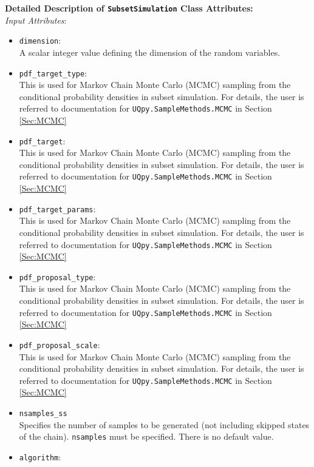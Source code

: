 \documentclass[./UsersGuide.tex]{subfiles}
\begin{document}
\noindent\textbf{Detailed Description of \texttt{SubsetSimulation} Class Attributes:}\\

\noindent\textit{Input Attributes}:
\begin{itemize}
\item \texttt{dimension}:\\ 
	A scalar integer value defining the dimension of the random variables. 
\item \texttt{pdf\_target\_type}:\\ 
	This is used for Markov Chain Monte Carlo (MCMC) sampling from the conditional probability densities in subset simulation. For details, the user is referred to documentation for 		\texttt{UQpy.SampleMethods.MCMC} in Section \ref{Sec:MCMC}
\item \texttt{pdf\_target}:\\ 
	This is used for Markov Chain Monte Carlo (MCMC) sampling from the conditional probability densities in subset simulation. For details, the user is referred to documentation for 		\texttt{UQpy.SampleMethods.MCMC} in Section \ref{Sec:MCMC}
\item \texttt{pdf\_target\_params}:\\
	This is used for Markov Chain Monte Carlo (MCMC) sampling from the conditional probability densities in subset simulation. For details, the user is referred to documentation for 		\texttt{UQpy.SampleMethods.MCMC} in Section \ref{Sec:MCMC}
\item \texttt{pdf\_proposal\_type}:\\ 
	This is used for Markov Chain Monte Carlo (MCMC) sampling from the conditional probability densities in subset simulation. For details, the user is referred to documentation for 		\texttt{UQpy.SampleMethods.MCMC} in Section \ref{Sec:MCMC}
\item \texttt{pdf\_proposal\_scale}:\\ 
	This is used for Markov Chain Monte Carlo (MCMC) sampling from the conditional probability densities in subset simulation. For details, the user is referred to documentation for 		\texttt{UQpy.SampleMethods.MCMC} in Section \ref{Sec:MCMC}
\item \texttt{nsamples\_ss}\\
	Specifies the number of samples to be generated (not including skipped states of the chain). \texttt{nsamples} must be specified. There is no default value.
\item \texttt{algorithm}: \\ 

\end{itemize}
\end{document}
